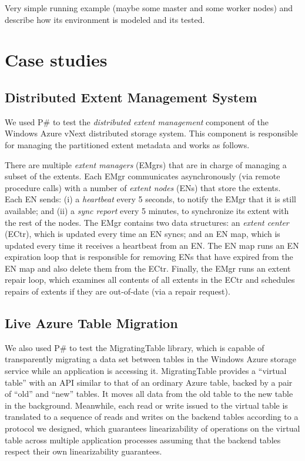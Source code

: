 \documentclass{sig-alternate}
\newcommand{\psharp}{P\#\xspace}
\begin{document}
Very simple running example (maybe some master and some worker nodes) and describe how its environment is modeled and its tested.

\section{Case studies}
\label{sec:cases}

\subsection{Distributed Extent Management System}
\label{sec:cases:azurestore}

We used \psharp to test the \emph{distributed extent management} component of the Windows Azure vNext distributed storage system. This component is responsible for managing the partitioned extent metadata and works as follows.

There are multiple \emph{extent managers} (EMgrs) that are in charge of managing a subset of the extents. Each EMgr communicates asynchronously (via remote procedure calls) with a number of \emph{extent nodes} (ENs) that store the extents. Each EN sends: (i) a \emph{heartbeat} every 5 seconds, to notify the EMgr that it is still available; and (ii) a \emph{sync report} every 5 minutes, to synchronize its extent with the rest of the nodes. The EMgr contains two data structures: an \emph{extent center} (ECtr), which is updated every time an EN syncs; and an EN map, which is updated every time it receives a heartbeat from an EN. The EN map runs an EN expiration loop that is responsible for removing ENs that have expired from the EN map and also delete them from the ECtr. Finally, the EMgr runs an extent repair loop, which examines all contents of all extents in the ECtr and schedules repairs of extents if they are out-of-date (via a repair request).

\subsection{Live Azure Table Migration}

We also used \psharp to test the MigratingTable library, which is capable of transparently migrating a data set between tables in the Windows Azure storage service while an application is accessing it.  MigratingTable provides a ``virtual table'' with an API similar to that of an ordinary Azure table, backed by a pair of ``old'' and ``new''  tables.  It moves all data from the old table to the new table in the background.  Meanwhile, each read or write issued to the virtual table is translated to a sequence of reads and writes on the backend tables according to a protocol we designed, which guarantees linearizability of operations on the virtual table across multiple application processes assuming that the backend tables respect their own linearizability guarantees.
\end{document}
